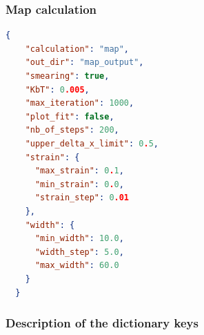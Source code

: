 \documentclass[a4paper,12pt]{article}
\begin{document}
\subsubsection{Map calculation}

\begin{lstlisting}[language=json,firstnumber=1]
  { 
    "calculation": "map", 
    "out_dir": "map_output", 
    "smearing": true, 
    "KbT": 0.005, 
    "max_iteration": 1000, 
    "plot_fit": false, 
    "nb_of_steps": 200, 
    "upper_delta_x_limit": 0.5, 
    "strain": {  
      "max_strain": 0.1, 
      "min_strain": 0.0, 
      "strain_step": 0.01
    }, 
    "width": {  
      "min_width": 10.0, 
      "width_step": 5.0, 
      "max_width": 60.0
    }
  }
\end{lstlisting}

\subsubsection*{Description of the dictionary keys}
\end{document}
